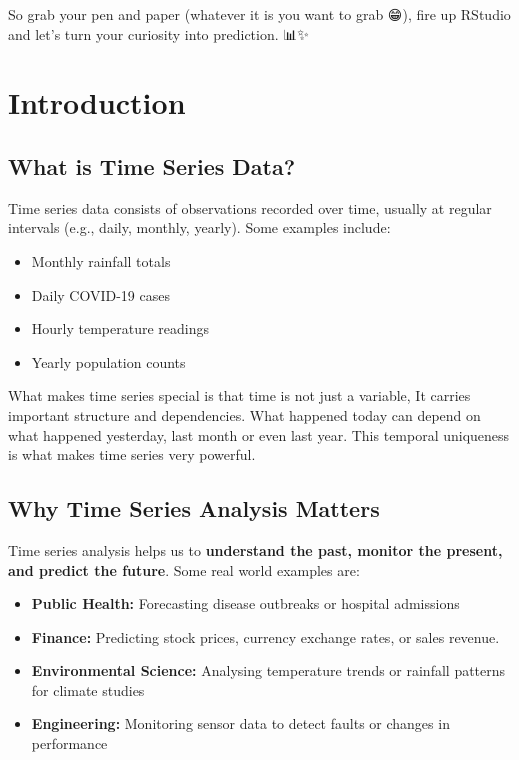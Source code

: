 \documentclass[
  letterpaper,
  DIV=11,
  numbers=noendperiod]{scrreprt}
\providecommand{\tightlist}{%
  \setlength{\itemsep}{0pt}\setlength{\parskip}{0pt}}\usepackage{longtable,booktabs,array}
\begin{document}
So grab your pen and paper (whatever it is you want to grab 😁), fire up
RStudio and let's turn your curiosity into prediction. 📊✨


\chapter{Introduction}\label{sec-introduction}

\section{What is Time Series Data?}\label{what-is-time-series-data}

Time series data consists of observations recorded over time, usually at
regular intervals (e.g., daily, monthly, yearly). Some examples include:

\begin{itemize}
\tightlist
\item
  Monthly rainfall totals
\item
  Daily COVID-19 cases
\item
  Hourly temperature readings
\item
  Yearly population counts
\end{itemize}

What makes time series special is that time is not just a variable, It
carries important structure and dependencies. What happened today can
depend on what happened yesterday, last month or even last year. This
temporal uniqueness is what makes time series very powerful.

\section{Why Time Series Analysis
Matters}\label{why-time-series-analysis-matters}

Time series analysis helps us to \textbf{understand the past, monitor
the present, and predict the future}. Some real world examples are:

\begin{itemize}
\tightlist
\item
  \textbf{Public Health:} Forecasting disease outbreaks or hospital
  admissions
\item
  \textbf{Finance:} Predicting stock prices, currency exchange rates, or
  sales revenue.
\item
  \textbf{Environmental Science:} Analysing temperature trends or
  rainfall patterns for climate studies
\item
  \textbf{Engineering:} Monitoring sensor data to detect faults or
  changes in performance
\end{itemize}
\end{document}
